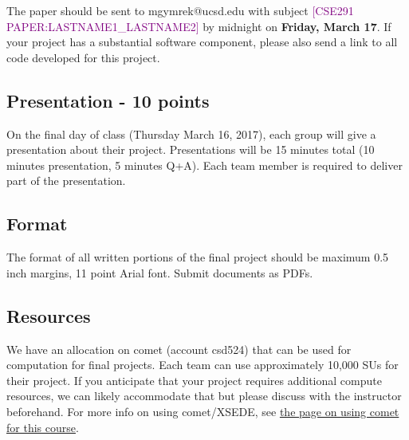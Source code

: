 \documentclass[12pt]{article}
\begin{document}
The paper should be sent to mgymrek@ucsd.edu with subject \textcolor{purple}{[CSE291 PAPER:LASTNAME1\_LASTNAME2]} by midnight on \textbf{Friday, March 17}. If your project has a substantial software component, please also send a link to all code developed for this project.

\subsection*{Presentation - 10 points}
On the final day of class (Thursday March 16, 2017), each group will give a presentation about their project. Presentations will be 15 minutes total (10 minutes presentation, 5 minutes Q+A). Each team member is required to deliver part of the presentation.

\subsection*{Format}
The format of all written portions of the final project should be maximum 0.5 inch margins, 11 point Arial font. Submit documents as PDFs.

\subsection*{Resources}
We have an allocation on comet (account csd524) that can be used for computation for final projects. Each team can use approximately 10,000 SUs for their project. If you anticipate that your project requires additional compute resources, we can likely accommodate that but please discuss with the instructor beforehand. For more info on using comet/XSEDE, see \href{https://gymreklab.github.io/teaching/personal_genomics/using_comet.html}{the page on using comet for this course}.
\end{document}
